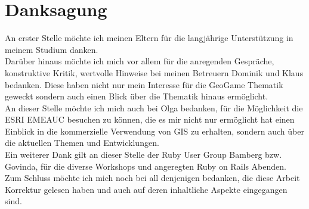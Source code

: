 \chapter*{Danksagung}
\label{ch0:Dank}

An erster Stelle möchte ich meinen Eltern für die langjährige Unterstützung in meinem Studium danken.\\
Darüber hinaus möchte ich mich vor allem für die anregenden Gespräche, konstruktive Kritik, wertvolle Hinweise bei meinen Betreuern Dominik und Klaus bedanken.
Diese haben nicht nur mein Interesse für die GeoGame Thematik geweckt sondern auch einen Blick über die Thematik hinaus ermöglicht.\\
An dieser Stelle möchte ich mich auch bei Olga bedanken, für die Möglichkeit die ESRI EMEAUC besuchen zu können, die es mir nicht nur ermöglicht hat einen Einblick in die kommerzielle Verwendung von GIS zu erhalten, sondern auch über die aktuellen Themen und Entwicklungen.\\
Ein weiterer Dank gilt an dieser Stelle der Ruby User Group Bamberg bzw. Govinda, für die diverse Workshops und angeregten Ruby on Rails Abenden.
Zum Schluss möchte ich mich noch bei all denjenigen bedanken, die diese Arbeit Korrektur gelesen haben und auch auf deren inhaltliche Aspekte eingegangen sind.\\

